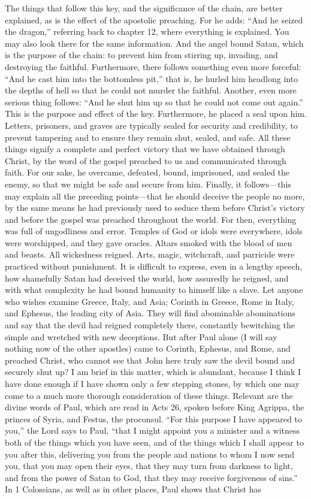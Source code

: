 The things that follow this key, and the significance of the chain, are better explained, as is the effect of the apostolic preaching. For he adds: “And he seized the dragon,” referring back to chapter 12, where everything is explained. You may also look there for the same information. And the angel bound Satan, which is the purpose of the chain: to prevent him from stirring up, invading, and destroying the faithful. Furthermore, there follows something even more forceful: “And he cast him into the bottomless pit,” that is, he hurled him headlong into the depths of hell so that he could not murder the faithful. Another, even more serious thing follows: “And he shut him up so that he could not come out again.” This is the purpose and effect of the key. Furthermore, he placed a seal upon him. Letters, prisoners, and graves are typically sealed for security and credibility, to prevent tampering and to ensure they remain shut, sealed, and safe. All these things signify a complete and perfect victory that we have obtained through Christ, by the word of the gospel preached to us and communicated through faith. For our sake, he overcame, defeated, bound, imprisoned, and sealed the enemy, so that we might be safe and secure from him. Finally, it follows—this may explain all the preceding points—that he should deceive the people no more, by the same means he had previously used to seduce them before Christ’s victory and before the gospel was preached throughout the world. For then, everything was full of ungodliness and error. Temples of God or idols were everywhere, idols were worshipped, and they gave oracles. Altars smoked with the blood of men and beasts. All wickedness reigned. Arts, magic, witchcraft, and parricide were practiced without punishment. It is difficult to express, even in a lengthy speech, how shamefully Satan had deceived the world, how assuredly he reigned, and with what complexity he had bound humanity to himself like a slave. Let anyone who wishes examine Greece, Italy, and Asia; Corinth in Greece, Rome in Italy, and Ephesus, the leading city of Asia. They will find abominable abominations and say that the devil had reigned completely there, constantly bewitching the simple and wretched with new deceptions. But after Paul alone (I will say nothing now of the other apostles) came to Corinth, Ephesus, and Rome, and preached Christ, who cannot see that John here truly saw the devil bound and securely shut up? I am brief in this matter, which is abundant, because I think I have done enough if I have shown only a few stepping stones, by which one may come to a much more thorough consideration of these things. Relevant are the divine words of Paul, which are read in Acts 26, spoken before King Agrippa, the princes of Syria, and Festus, the proconsul. “For this purpose I have appeared to you,” the Lord says to Paul, “that I might appoint you a minister and a witness both of the things which you have seen, and of the things which I shall appear to you after this, delivering you from the people and nations to whom I now send you, that you may open their eyes, that they may turn from darkness to light, and from the power of Satan to God, that they may receive forgiveness of sins.” In 1 Colossians, as well as in other places, Paul shows that Christ has 